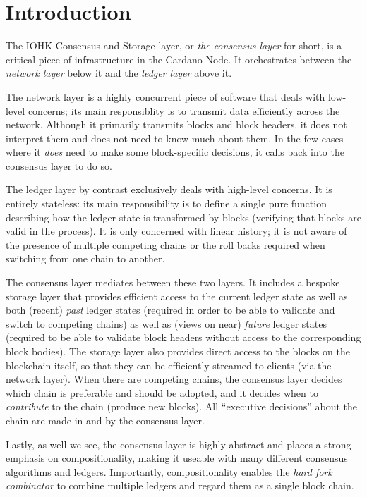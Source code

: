 \chapter{Introduction}

The IOHK Consensus and Storage layer, or \emph{the consensus layer} for short,
is a critical piece of infrastructure in the Cardano Node. It orchestrates
between the \emph{network layer} below it and the \emph{ledger layer} above it.

The network layer is a highly concurrent piece of software that deals with
low-level concerns; its main responsiblity is to transmit data efficiently
across the network. Although it primarily transmits blocks and block headers, it
does not interpret them and does not need to know much about them. In the few
cases where it \emph{does} need to make some block-specific decisions, it
calls back into the consensus layer to do so.

The ledger layer by contrast exclusively deals with high-level concerns. It is
entirely stateless: its main responsibility is to define a single pure
function describing how the ledger state is transformed by blocks (verifying
that blocks are valid in the process). It is only concerned with linear history;
it is not aware of the presence of multiple competing chains or the roll backs
required when switching from one chain to another.

The consensus layer mediates between these two layers. It includes a
bespoke storage layer that provides efficient access to the current ledger state
as well as both (recent) \emph{past} ledger states (required in order to be able
to validate and switch to competing chains) as well as (views on near)
\emph{future} ledger states (required to be able to validate block headers
without access to the corresponding block bodies). The storage layer also
provides direct access to the blocks on the blockchain itself,  so that they can
be efficiently streamed to clients (via the network layer). When there are
competing chains, the consensus layer decides which chain is preferable and
should be adopted, and it decides when to \emph{contribute} to the chain
(produce new blocks). All ``executive decisions'' about the chain are made in
and by the consensus layer.

Lastly, as well we see, the consensus layer is highly abstract and places a
strong emphasis on compositionality, making it useable with many different
consensus algorithms and ledgers. Importantly, compositionality enables the
\emph{hard fork combinator} to combine multiple ledgers and regard them as a
single block chain.

